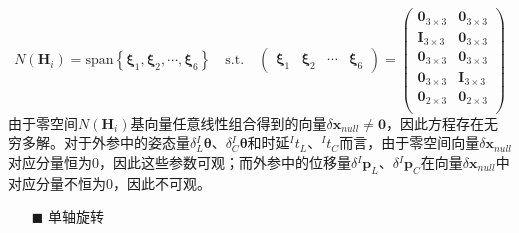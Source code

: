 \begin{equation}
  N(\boldsymbol{H}_i)=\mathrm{span}\left\lbrace
  \boldsymbol{\xi}_1,\boldsymbol{\xi}_2,\cdots,\boldsymbol{\xi}_{6}
  \right\rbrace
  \quad\mathrm{s.t.}\quad
  \begin{pmatrix}
    \boldsymbol{\xi}_1 & \boldsymbol{\xi}_2 & \cdots & \boldsymbol{\xi}_{6}
  \end{pmatrix}=
  \begin{pmatrix}
    \boldsymbol{0}_{3\times 3} & \boldsymbol{0}_{3\times 3} \\
    \boldsymbol{I}_{3\times 3} & \boldsymbol{0}_{3\times 3} \\
    \boldsymbol{0}_{3\times 3} & \boldsymbol{0}_{3\times 3} \\
    \boldsymbol{0}_{3\times 3} & \boldsymbol{I}_{3\times 3} \\
    \boldsymbol{0}_{2\times 3} & \boldsymbol{0}_{2\times 3} \\
  \end{pmatrix}
\end{equation}
由于零空间$N(\boldsymbol{H}_i)$基向量任意线性组合得到的向量$\delta\boldsymbol{x}_{null}\ne\boldsymbol{0}$，因此方程存在无穷多解。对于外参中的姿态量$\delta {^{I}_{L}\boldsymbol{\theta}}$、$\delta {^{I}_{C}\boldsymbol{\theta}}$和时延${^{I}t_{L}}$、${^{I}t_{C}}$而言，由于零空间向量$\delta\boldsymbol{x}_{null}$对应分量恒为0，因此这些参数可观；而外参中的位移量$\delta {^{I}\boldsymbol{p}_L}$、$\delta {^{I}\boldsymbol{p}_C}$在向量$\delta\boldsymbol{x}_{null}$中对应分量不恒为0，因此不可观。

\begin{itemize}
  \item[$\blacksquare$]单轴旋转
\end{itemize}

